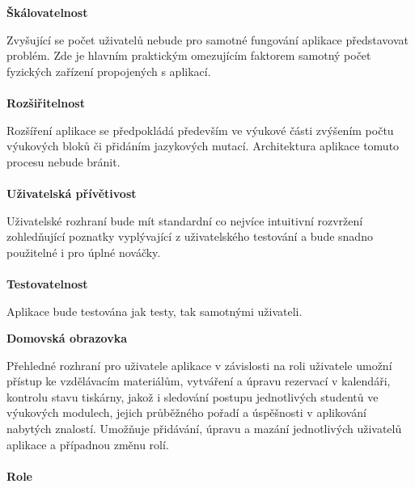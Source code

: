 \documentclass[twoside, 12pt]{article}
\begin{document}
\textbf{Škálovatelnost}

Zvyšující se počet uživatelů nebude pro samotné fungování aplikace představovat problém. Zde je hlavním praktickým omezujícím faktorem samotný počet fyzických zařízení propojených s aplikací.
\\
\\
\textbf{Rozšiřitelnost}

Rozšíření aplikace se předpokládá především ve výukové části zvýšením počtu výukových bloků či přidáním jazykových mutací. Architektura aplikace tomuto procesu nebude bránit.
\\
\\
\textbf{Uživatelská přívětivost}

Uživatelské rozhraní bude mít standardní co nejvíce intuitivní rozvržení zohledňující poznatky vyplývající z uživatelského testování a bude snadno použitelné i pro úplné nováčky.
\\
\\
\textbf{Testovatelnost}

Aplikace bude testována jak testy, tak samotnými uživateli.




\textbf{Domovská obrazovka}

Přehledné rozhraní pro uživatele aplikace v závislosti na roli uživatele umožní přístup ke vzdělávacím materiálům, vytváření a úpravu rezervací v kalendáři, kontrolu stavu tiskárny, jakož i sledování postupu jednotlivých studentů ve výukových modulech, jejich průběžného pořadí a úspěšnosti v aplikování nabytých znalostí. Umožňuje přidávání, úpravu a mazání jednotlivých uživatelů aplikace a případnou změnu rolí.
\\
\\
\textbf{Role}
\end{document}
